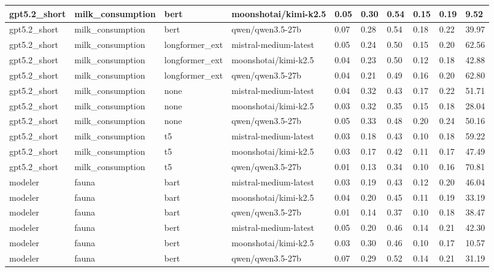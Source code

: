 \begin{tabular}{|l|l|l|l|l|l|l|l|l|l|}
 \hline
 gpt5.2\_short & milk\_consumption & bert & moonshotai/kimi-k2.5 & 0.05 & 0.30 & 0.54 & 0.15 & 0.19 & 9.52 \\
 \hline
 gpt5.2\_short & milk\_consumption & bert & qwen/qwen3.5-27b & 0.07 & 0.28 & 0.54 & 0.18 & 0.22 & 39.97 \\
 \hline
 gpt5.2\_short & milk\_consumption & longformer\_ext & mistral-medium-latest & 0.05 & 0.24 & 0.50 & 0.15 & 0.20 & 62.56 \\
 \hline
 gpt5.2\_short & milk\_consumption & longformer\_ext & moonshotai/kimi-k2.5 & 0.04 & 0.23 & 0.50 & 0.12 & 0.18 & 42.88 \\
 \hline
 gpt5.2\_short & milk\_consumption & longformer\_ext & qwen/qwen3.5-27b & 0.04 & 0.21 & 0.49 & 0.16 & 0.20 & 62.80 \\
 \hline
 gpt5.2\_short & milk\_consumption & none & mistral-medium-latest & 0.04 & 0.32 & 0.43 & 0.17 & 0.22 & 51.71 \\
 \hline
 gpt5.2\_short & milk\_consumption & none & moonshotai/kimi-k2.5 & 0.03 & 0.32 & 0.35 & 0.15 & 0.18 & 28.04 \\
 \hline
 gpt5.2\_short & milk\_consumption & none & qwen/qwen3.5-27b & 0.05 & 0.33 & 0.48 & 0.20 & 0.24 & 50.16 \\
 \hline
 gpt5.2\_short & milk\_consumption & t5 & mistral-medium-latest & 0.03 & 0.18 & 0.43 & 0.10 & 0.18 & 59.22 \\
 \hline
 gpt5.2\_short & milk\_consumption & t5 & moonshotai/kimi-k2.5 & 0.03 & 0.17 & 0.42 & 0.11 & 0.17 & 47.49 \\
 \hline
 gpt5.2\_short & milk\_consumption & t5 & qwen/qwen3.5-27b & 0.01 & 0.13 & 0.34 & 0.10 & 0.16 & 70.81 \\
 \hline
 modeler & fauna & bart & mistral-medium-latest & 0.03 & 0.19 & 0.43 & 0.12 & 0.20 & 46.04 \\
 \hline
 modeler & fauna & bart & moonshotai/kimi-k2.5 & 0.04 & 0.20 & 0.45 & 0.11 & 0.19 & 33.19 \\
 \hline
 modeler & fauna & bart & qwen/qwen3.5-27b & 0.01 & 0.14 & 0.37 & 0.10 & 0.18 & 38.47 \\
 \hline
 modeler & fauna & bert & mistral-medium-latest & 0.05 & 0.20 & 0.46 & 0.14 & 0.21 & 42.30 \\
 \hline
 modeler & fauna & bert & moonshotai/kimi-k2.5 & 0.03 & 0.30 & 0.46 & 0.10 & 0.17 & 10.57 \\
 \hline
 modeler & fauna & bert & qwen/qwen3.5-27b & 0.07 & 0.29 & 0.52 & 0.14 & 0.21 & 31.19 \\

\end{tabular}
